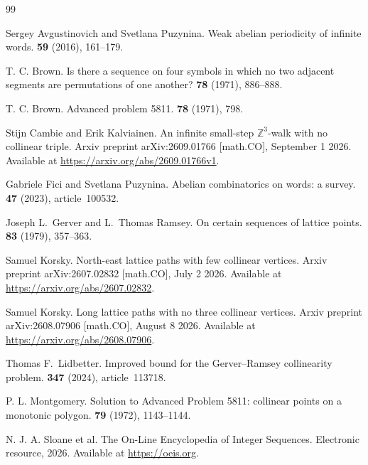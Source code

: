 \documentclass[12pt,reqno]{article}
\newcommand{\Z}{\mathbb Z}
\begin{document}
\begin{thebibliography}{99}

Sergey Avgustinovich and Svetlana Puzynina.
\newblock Weak abelian periodicity of infinite words.
 \textbf{59} (2016), 161--179.

T. C. Brown.
\newblock Is there a sequence on four symbols in which no two adjacent
segments are permutations of one another?
 {\bf 78} (1971), 886--888.

T. C. Brown.
\newblock Advanced problem 5811.
 {\bf 78} (1971), 798.

Stijn Cambie and Erik Kalviainen.
\newblock An infinite small-step $\Z^3$-walk with no collinear triple.
\newblock Arxiv preprint arXiv:2609.01766 [math.CO],
September 1 2026.  Available at
\url{https://arxiv.org/abs/2609.01766v1}.

Gabriele Fici and Svetlana Puzynina.
\newblock Abelian combinatorics on words: a survey.
 \textbf{47} (2023), article~100532.

Joseph L.~Gerver and L.~Thomas Ramsey.
\newblock On certain sequences of lattice points.
 \textbf{83} (1979), 357--363.

Samuel Korsky.
\newblock North-east lattice paths with few collinear vertices.
\newblock Arxiv preprint arXiv:2607.02832 [math.CO], July 2 2026.
\newblock Available at \url{https://arxiv.org/abs/2607.02832}.

Samuel Korsky.
\newblock Long lattice paths with no three collinear vertices.
\newblock Arxiv preprint arXiv:2608.07906 [math.CO], August 8 2026.
\newblock Available at \url{https://arxiv.org/abs/2608.07906}.

Thomas F.~Lidbetter.
\newblock Improved bound for the Gerver--Ramsey collinearity problem.
 \textbf{347} (2024), article~113718.

P. L. Montgomery. 
\newblock Solution to Advanced Problem 5811: 
collinear points on a monotonic polygon.
 \textbf{79} (1972), 1143--1144.

N. J. A. Sloane et al.
\newblock The On-Line Encyclopedia of Integer Sequences.
\newblock Electronic resource, 2026.  Available at
\url{https://oeis.org}.





\end{thebibliography}
\end{document}
